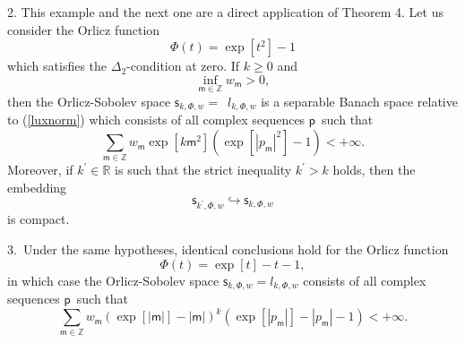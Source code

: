 \documentclass{article}
\begin{document}
2. This example and the next one are a direct application of Theorem 4. Let
us consider the Orlicz function\textit{\ }%
\begin{equation}
\Phi \left( t\right) =\exp \left[ t^{2}\right] -1  \label{orliczfunction}
\end{equation}%
which satisfies the $\Delta _{2}$-condition at zero. If $k\geq 0$ and%
\begin{equation*}
\inf_{\mathsf{m\in }\mathbb{Z}}w_{\mathsf{m}}>0,
\end{equation*}%
then the Orlicz-Sobolev space $\mathsf{s}_{k,\Phi ,w}=$\ $l_{k,\Phi ,w}$ is
a separable Banach space relative to (\ref{luxnorm}) which consists of all
complex sequences $\mathsf{p}$\ such that 
\begin{equation*}
\sum_{\mathsf{m}\in \mathbb{Z}}w_{\mathsf{m}}\exp \left[ k\mathsf{m}^{2}%
\right] \left( \exp \left[ \left\vert p_{\mathsf{m}}\right\vert ^{2}\right]
-1\right) <+\infty .
\end{equation*}%
Moreover, if $k^{\prime }\in \mathbb{R}$ is such that the strict inequality $%
k^{\prime }>k$ holds, then the embedding%
\begin{equation*}
\mathsf{s}_{k^{\prime },\Phi ,w}\hookrightarrow \mathsf{s}_{k,\Phi ,w}
\end{equation*}%
is compact.

\bigskip

3.\ Under the same hypotheses, identical conclusions hold for the Orlicz
function\textit{\ }%
\begin{equation}
\Phi \left( t\right) =\exp \left[ t\right] -t-1,  \label{orliczfunctionbis}
\end{equation}%
in which case the Orlicz-Sobolev space $\mathsf{s}_{k,\Phi ,w}=l_{k,\Phi ,w}$
consists of all complex sequences $\mathsf{p}$\ such that 
\begin{equation*}
\sum_{\mathsf{m}\in \mathbb{Z}}w_{\mathsf{m}}\left( \exp \left[ \left\vert 
\mathsf{m}\right\vert \right] -\left\vert \mathsf{m}\right\vert \right)
^{k}\left( \exp \left[ \left\vert p_{\mathsf{m}}\right\vert \right]
-\left\vert p_{\mathsf{m}}\right\vert -1\right) <+\infty .
\end{equation*}

\bigskip
\end{document}

